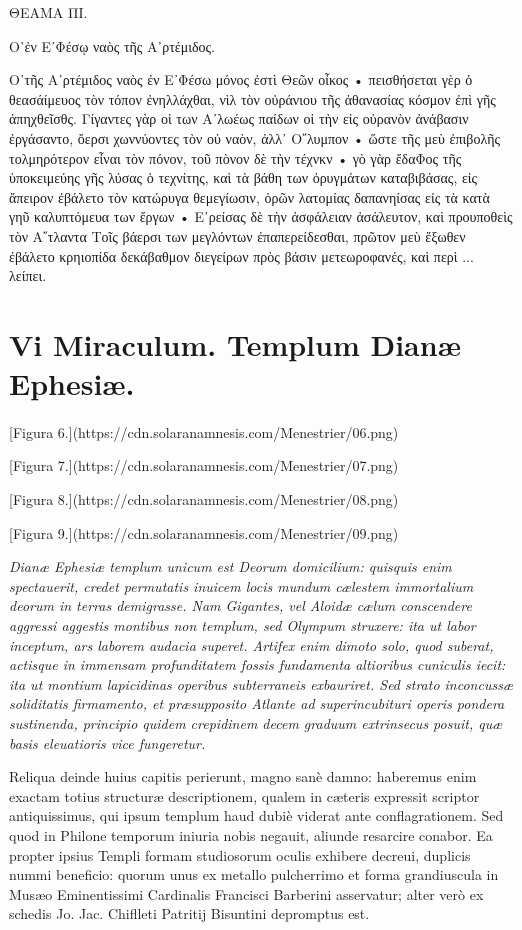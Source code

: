 \documentclass[a4paper, 11pt, oneside, polutonikogreek, latin]{article}
\begin{document}
ΘΕΑΜΑ ΠI.

Ο῾ἐν E᾽Φέσῳ ναὸς τῆς Α᾽ρτέμιδος.

Ο῾τῆς Α᾽ρτέμιδος ναὸς ἐν E᾽Φέσω μόνος ἐστὶ Θεῶν οἶκος • πεισθήσεται γὲρ ὁ θεασάίμευος τὸν τόπον ἐνηλλάχθαι, νὶλ τὸν οὐράνιου τῆς ἀθανασίας κόσμον ἐπὶ γῆς ἀπηχθεῖσθς. Γίγαντες γὰρ οἱ των Α᾽λωέως παίδων οἱ τὴν εἰς οὐρανὸν ἀνάβασιν ἐργάσαντο, ὄερσι χωννύοντες τὸν οὐ ναὸν, ἀλλ᾽ Ο῎λυμπον • ὥστε τῆς μεὺ ἐπιβολῆς τολμηρότερον εἶναι τὸν πόνον, τοῦ πὸνον δὲ τὴν τέχνκν • γὸ γὰρ ἔδαΦος τῆς ὑποκειμεύης γῆς λύσας ὁ τεχνίτης, καὶ τὰ βάθη των ὀρυγμάτων καταβιβάσας, εἰς ἄπειρον ἐβάλετο τὸν κατώρυγα θεμεγίωσιν, ὀρῶν λατομίας δαπανηίσας εἰς τὰ κατὰ γηῦ καλυπτόμευα των ἔργων • E᾽ρείσας δὲ τὴν ἀσφάλειαν ἀσάλευτον, καὶ προυποθεὶς τὸν Α῎τλαντα Τοῖς βάερσι των μεγλόντων ἐπαπερείδεσθαι, πρῶτον μεὺ ἔξωθεν ἐβάλετο κρηιοπίδα δεκάβαθμον διεγείρων πρὸς βάσιν μετεωροφανές, καὶ περὶ ... λείπει.
\clearpage
\section{Vi Miraculum. Templum Dianæ Ephesiæ.}
\paragraph{}
[Figura 6.](https://cdn.solaranamnesis.com/Menestrier/06.png)

[Figura 7.](https://cdn.solaranamnesis.com/Menestrier/07.png)

[Figura 8.](https://cdn.solaranamnesis.com/Menestrier/08.png)

[Figura 9.](https://cdn.solaranamnesis.com/Menestrier/09.png)

\emph{Dianæ Ephesiæ templum unicum est Deorum domicilium: quisquis enim spectauerit, credet permutatis inuicem locis mundum cælestem immortalium deorum in terras demigrasse. Nam Gigantes, vel Aloidæ cælum conscendere aggressi aggestis montibus non templum, sed Olympum struxere: ita ut labor inceptum, ars laborem audacia superet. Artifex enim dimoto solo, quod suberat, actisque in immensam profunditatem fossis fundamenta altioribus cuniculis iecit: ita ut montium lapicidinas operibus subterraneis exbauriret. Sed strato inconcussæ soliditatis firmamento, et præsupposito Atlante ad superincubituri operis pondera sustinenda, principio quidem crepidinem decem graduum extrinsecus posuit, quæ basis eleuatioris vice fungeretur.}

Reliqua deinde huius capitis perierunt, magno sanè damno: haberemus enim exactam totius structuræ descriptionem, qualem in cæteris expressit scriptor antiquissimus, qui ipsum templum haud dubiè viderat ante conflagrationem. Sed quod in Philone temporum iniuria nobis negauit, aliunde resarcire conabor. Ea propter ipsius Templi formam studiosorum oculis exhibere decreui, duplicis nummi beneficio: quorum unus ex metallo pulcherrimo et forma grandiuscula in Musæo Eminentissimi Cardinalis Francisci Barberini asservatur; alter verò ex schedis Jo. Jac. Chiflleti Patritij Bisuntini depromptus est.
\end{document}
